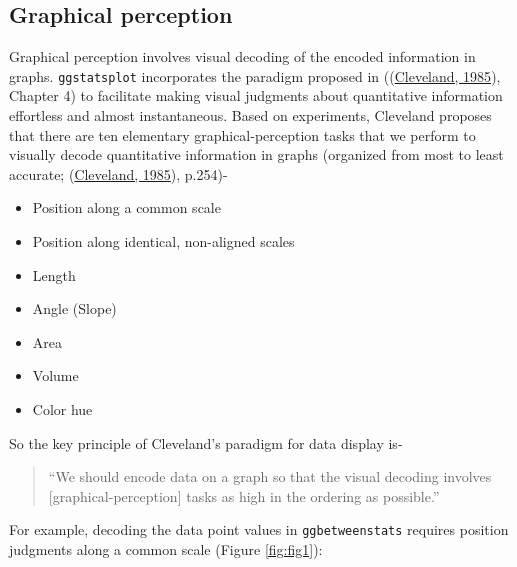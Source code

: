 \documentclass[
]{article}
\providecommand{\tightlist}{%
  \setlength{\itemsep}{0pt}\setlength{\parskip}{0pt}}
\begin{document}
\hypertarget{graphical-perception}{%
\subsection{Graphical perception}\label{graphical-perception}}

Graphical perception involves visual decoding of the encoded information in
graphs. \texttt{ggstatsplot} incorporates the paradigm proposed in
((\protect\hyperlink{ref-clevelandElementsGraphingData1985}{Cleveland, 1985}), Chapter 4) to facilitate making visual
judgments about quantitative information effortless and almost instantaneous.
Based on experiments, Cleveland proposes that there are ten elementary
graphical-perception tasks that we perform to visually decode quantitative
information in graphs (organized from most to least accurate;
(\protect\hyperlink{ref-clevelandElementsGraphingData1985}{Cleveland, 1985}), p.254)-

\begin{itemize}
\tightlist
\item
  Position along a common scale
\item
  Position along identical, non-aligned scales
\item
  Length
\item
  Angle (Slope)
\item
  Area
\item
  Volume
\item
  Color hue
\end{itemize}

So the key principle of Cleveland's paradigm for data display is-

\begin{quote}
``We should encode data on a graph so that the visual decoding involves
{[}graphical-perception{]} tasks as high in the ordering as possible.''
\end{quote}

For example, decoding the data point values in \texttt{ggbetweenstats} requires
position judgments along a common scale (Figure \ref{fig:fig1}):
\end{document}
